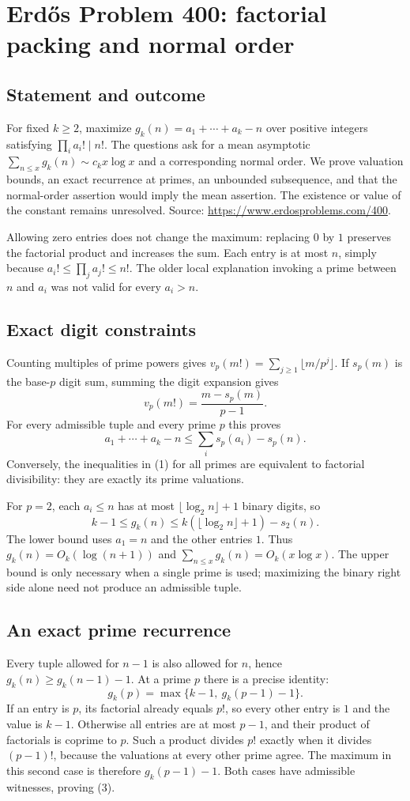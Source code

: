 \section*{Erd\H{o}s Problem 400: factorial packing and normal order}
\subsection*{Statement and outcome}
For fixed $k\ge2$, maximize $g_k(n)=a_1+\cdots+a_k-n$ over positive integers satisfying $\prod_i a_i!\mid n!$. The questions ask for a mean asymptotic $\sum_{n\le x}g_k(n)\sim c_kx\log x$ and a corresponding normal order. We prove valuation bounds, an exact recurrence at primes, an unbounded subsequence, and that the normal-order assertion would imply the mean assertion. The existence or value of the constant remains unresolved. Source: \url{https://www.erdosproblems.com/400}.

Allowing zero entries does not change the maximum: replacing $0$ by $1$ preserves the factorial product and increases the sum. Each entry is at most $n$, simply because $a_i!\le\prod_j a_j!\le n!$. The older local explanation invoking a prime between $n$ and $a_i$ was not valid for every $a_i>n$.

\subsection*{Exact digit constraints}
Counting multiples of prime powers gives $v_p(m!)=\sum_{j\ge1}\lfloor m/p^j\rfloor$. If $s_p(m)$ is the base-$p$ digit sum, summing the digit expansion gives
\[
 v_p(m!)=\frac{m-s_p(m)}{p-1}.
\]
For every admissible tuple and every prime $p$ this proves
\[
 a_1+\cdots+a_k-n\le\sum_i s_p(a_i)-s_p(n). \tag{1}
\]
Conversely, the inequalities in (1) for all primes are equivalent to factorial divisibility: they are exactly its prime valuations.

For $p=2$, each $a_i\le n$ has at most $\lfloor\log_2 n\rfloor+1$ binary digits, so
\[
 k-1\le g_k(n)\le k(\lfloor\log_2 n\rfloor+1)-s_2(n). \tag{2}
\]
The lower bound uses $a_1=n$ and the other entries $1$. Thus $g_k(n)=O_k(\log(n+1))$ and $\sum_{n\le x}g_k(n)=O_k(x\log x)$. The upper bound is only necessary when a single prime is used; maximizing the binary right side alone need not produce an admissible tuple.

\subsection*{An exact prime recurrence}
Every tuple allowed for $n-1$ is also allowed for $n$, hence $g_k(n)\ge g_k(n-1)-1$. At a prime $p$ there is a precise identity:
\[
 g_k(p)=\max\{k-1,\ g_k(p-1)-1\}. \tag{3}
\]
If an entry is $p$, its factorial already equals $p!$, so every other entry is $1$ and the value is $k-1$. Otherwise all entries are at most $p-1$, and their product of factorials is coprime to $p$. Such a product divides $p!$ exactly when it divides $(p-1)!$, because the valuations at every other prime agree. The maximum in this second case is therefore $g_k(p-1)-1$. Both cases have admissible witnesses, proving (3).

